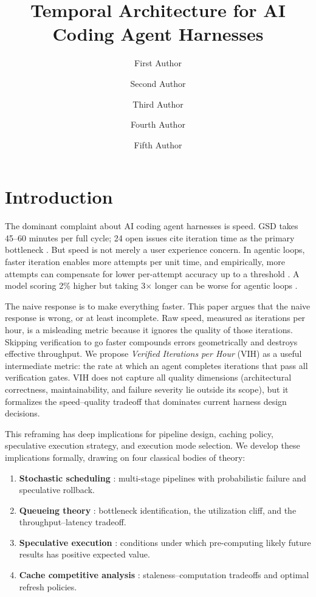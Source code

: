 \documentclass[11pt, a4paper, logo, copyright]{googledeepmind}
\title{Temporal Architecture for AI Coding Agent Harnesses}
\author[1]{First Author}
\author[2]{Second Author}
\author[2]{Third Author}
\author[1]{Fourth Author}
\author[1]{Fifth Author}
\affil[]{Pragnition Labs}
\affil[*]{Equal Contribution}
\affil[1]{Affiliation 1}
\affil[2]{Affiliation 2}
\begin{document}
\maketitle

\section{Introduction}\label{sec:intro}

The dominant complaint about AI coding agent harnesses is speed. GSD takes 45--60 minutes per full cycle; 24 open issues cite iteration time as the primary bottleneck \citep{iskohm2026comparison}. But speed is not merely a user experience concern. In agentic loops, faster iteration enables more attempts per unit time, and empirically, more attempts can compensate for lower per-attempt accuracy up to a threshold \citep{sweeffi2025}. A model scoring 2\% higher but taking 3$\times$ longer can be worse for agentic loops \citep{iskohm2026comparison}.

The naive response is to make everything faster. This paper argues that the naive response is wrong, or at least incomplete. Raw speed, measured as iterations per hour, is a misleading metric because it ignores the quality of those iterations. Skipping verification to go faster compounds errors geometrically and destroys effective throughput. We propose \emph{Verified Iterations per Hour} (VIH) as a useful intermediate metric: the rate at which an agent completes iterations that pass all verification gates. VIH does not capture all quality dimensions (architectural correctness, maintainability, and failure severity lie outside its scope), but it formalizes the speed--quality tradeoff that dominates current harness design decisions.

This reframing has deep implications for pipeline design, caching policy, speculative execution strategy, and execution mode selection. We develop these implications formally, drawing on four classical bodies of theory:

\begin{enumerate}[label=(\roman*)]
    \item \textbf{Stochastic scheduling} \citep{graham1966bounds, mohring1984stochastic, pinedo2016scheduling}: multi-stage pipelines with probabilistic failure and speculative rollback.
    \item \textbf{Queueing theory} \citep{little1961proof, kingman1961single, hopp2000factory}: bottleneck identification, the utilization cliff, and the throughput--latency tradeoff.
    \item \textbf{Speculative execution} \citep{tomasulo1967efficient, smith1981branch, yeh1991two}: conditions under which pre-computing likely future results has positive expected value.
    \item \textbf{Cache competitive analysis} \citep{belady1966replacement, sleator1985amortized, denning1968working}: staleness--computation tradeoffs and optimal refresh policies.
\end{enumerate}
\end{document}
